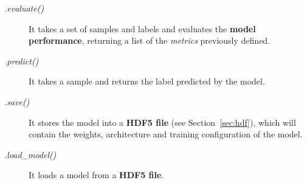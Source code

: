 \begin{description}
	\item[\textit{.evaluate()}] It takes a set of samples and labels and evaluates the \textbf{model performance}, returning a list of the \textit{metrics} previously defined.
\end{description}

\begin{description}
	\item[\textit{.predict()}] It takes a sample and returns the label predicted by the model.
\end{description}

\begin{description}
	\item[\textit{.save()}] It stores the model into a \textbf{HDF5 file} (see Section~\ref{sec:hdf}), which will contain the weights, architecture and training configuration of the model.
\end{description}

\begin{description}
	\item[\textit{.load\_model()}] It loads a model from a \textbf{HDF5 file}.
\end{description}

